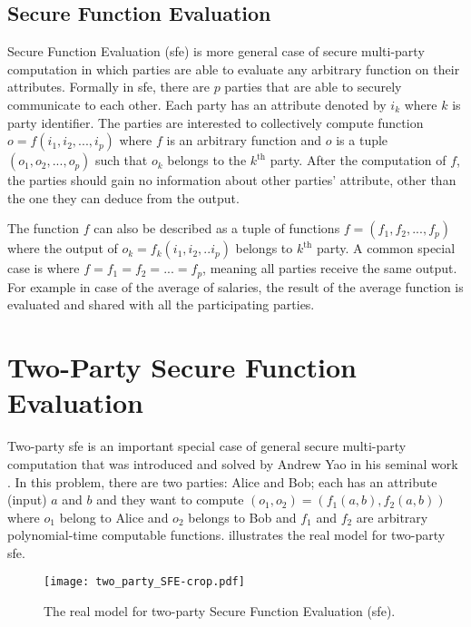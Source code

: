 \subsection{Secure Function Evaluation}\label{ssec:prelim-sfe}
Secure Function Evaluation (\acrshort{sfe}) is more general case of secure multi-party computation in which parties are able to evaluate any arbitrary function on their attributes.
Formally in \acrshort{sfe}, there are $p$ parties that are able to securely communicate to each other.
Each party has an attribute denoted by $i_k$ where $k$ is party identifier.
The parties are interested to collectively compute function $o = f(i_1, i_2, ..., i_p)$ where $f$ is an arbitrary function and $o$ is a tuple $(o_1, o_2, ..., o_p)$ such that $o_k$ belongs to the $k^{\text{th}}$ party.
After the computation of $f$, the parties should gain no information about other parties' attribute, other than the one they can deduce from the output.

The function $f$ can also be described as a tuple of functions $f = (f_1, f_2, ...,  f_p)$ where the output of $o_k = f_k(i_1, i_2, .. i_p)$ belongs to $k^{\text{th}}$ party.
A common special case is where $f = f_1 = f_2 = ... = f_p$, meaning all parties receive the same output.
For example in case of the average of salaries, the result of the average function is evaluated and shared with all the participating parties.

\section{Two-Party Secure Function Evaluation}\label{sec:prelim-2sfe}
Two-party \acrshort{sfe} is an important special case of general secure multi-party computation that was introduced and solved by Andrew Yao in his seminal work \cite{yao1986generate}.
In this problem, there are two parties: Alice and Bob; each has an attribute (input) $a$ and $b$ and they want to compute $(o_1, o_2) = (f_1(a, b), f_2(a, b))$ where $o_1$ belong to Alice and $o_2$ belongs to Bob and $f_1$ and $f_2$ are arbitrary polynomial-time computable functions.
 illustrates the real model for two-party \acrshort{sfe}.

\begin{figure}[ht]
\centering
\texttt{[image: two\_party\_SFE-crop.pdf]}
\caption{The real model for two-party Secure Function Evaluation (\acrshort{sfe}).}
\label{fig:two-party-sfe}
\end{figure}

